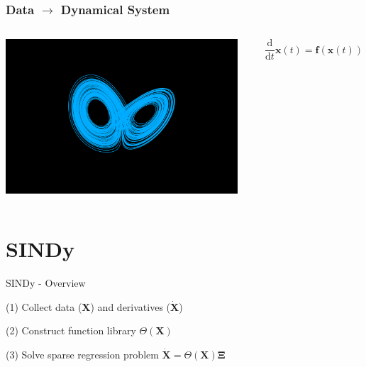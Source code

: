\documentclass[aspectratio=169]{beamer}
\begin{document}
\begin{frame}
\frametitle{Data $\to$ Dynamical System}
\begin{columns}
	\begin{center}
		\includegraphics[width=0.95\textwidth, trim={4cm, 1.5cm, 4cm, 3cm}, clip]{Examples/slide3_lorenz_attractor.pdf}
	\end{center}

	\[ \frac{\mathrm d}{\mathrm dt} \mathbf x(t) = \mathbf f(\mathbf x(t)) \]
\end{columns}

\end{frame}



\section{SINDy}

\begin{frame}{SINDy - Overview}

\begin{vfilleditems}
	\item[(1)] Collect data ($\mathbf X$) and derivatives ($\mathbf {\dot X}$)
	\item[(2)] Construct function library $\Theta(\mathbf X)$
	\item[(3)] Solve sparse regression problem $\mathbf {\dot X} = \Theta(\mathbf X) \mathbf \Xi$
\end{vfilleditems}
\end{frame}
\end{document}
